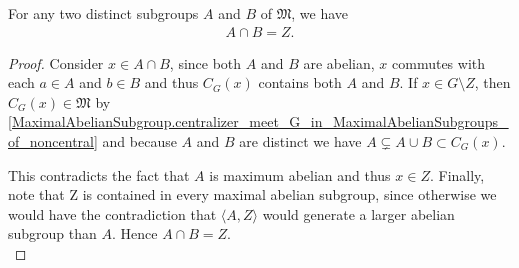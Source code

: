 \begin{theorem}
  \label{MaximalAbelianSubgroup.center_eq_meet_of_ne_MaximalAbelianSubgroups}
For any two distinct subgroups $A$ and $B$ of $\mathfrak{M}$, we have
\begin{align*} A \cap B = Z. \end{align*}
\end{theorem}
\begin{proof}
  \leanok
  Consider $x \in A \cap B$, since both $A$ and $B$ are abelian, $x$ commutes with each $a \in A$ and $b \in B$ and thus $C_G(x)$ contains both $A$ and $B$.  If $x \in G \setminus Z$, then $C_G(x) \in \mathfrak{M}$ by \ref{MaximalAbelianSubgroup.centralizer_meet_G_in_MaximalAbelianSubgroups_of_noncentral} and because $A$ and $B$ are distinct we have $A \subsetneq A \cup B \subset C_G(x)$. 
  
  This contradicts the fact that $A$ is maximum abelian and thus $x \in Z$. Finally, note that Z is contained in every maximal abelian subgroup, since otherwise we would have the contradiction that $\langle A, Z \rangle$ would generate a larger abelian subgroup than $A$. Hence $A \cap B = Z$. \\
\end{proof}
